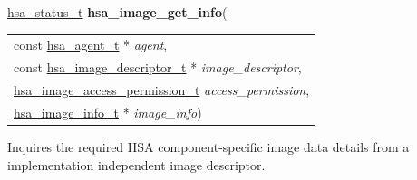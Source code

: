 \documentclass[final]{book}
\newcommand{\hsaarg}[1]{\textit{#1}}
\begin{document}
\begin{appendices}
\noindent\begin{tcolorbox}[breakable,nobeforeafter,colframe=white,colback=lightgray,left=0mm]
\hyperlink{group--status-1gad755322e7ff95456520e8abdbe90d225}{hsa_status_t} \hypertarget{group--images-1ga86abda7e50864b5537a209b12f40f030}{\textbf{hsa_image_get_info}}(
\vspace{-3.5mm}\begin{longtable}{@{}p{\textwidth}}
\hspace{1.7em}const \hyperlink{group--topology-1gab8db3fb886332a24acac08ec361e1d86}{hsa_agent_t} * \hsaarg{agent},\\
\hspace{1.7em}const \hyperlink{group--images-1ga92eb44fcaceb4f1b16dfc9b655bc6f3b}{hsa_image_descriptor_t} * \hsaarg{image_descriptor},\\
\hspace{1.7em}\hyperlink{group--images-1gab28dbe36c6c4d5186034af5d6cc20dea}{hsa_image_access_permission_t} \hsaarg{access_permission},\\
\hspace{1.7em}\hyperlink{group--images-1ga8b226310d50050b6a9ad73c91ee6eca2}{hsa_image_info_t} * \hsaarg{image_info})\end{longtable}

\end{tcolorbox}
Inquires the required HSA component-specific image data details from a implementation independent image descriptor.


\end{appendices}
\end{document}
